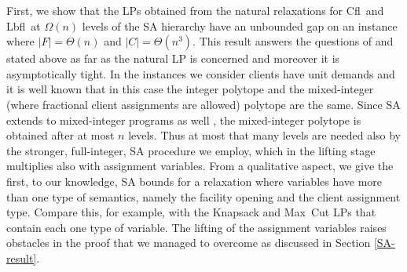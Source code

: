 \documentclass[11pt]{article}
\newcommand{\lbfl}{{\sc Lbfl}}
\newcommand{\cfl}{{\sc Cfl}}
\begin{document}
First, we show that the LPs  obtained from the
natural relaxations for  \cfl\ and \lbfl\ at $\Omega(n)$ levels of the 
SA hierarchy have an unbounded gap on an  instance
where 
 $|F|=\Theta(n)$ and $|C|= \Theta(n^3).$ 
This result answers the questions of \cite{LiS13} and
\cite{AnBS13} stated above as far as the natural LP is concerned 
and moreover it  is asymptotically tight.
In the  instances we consider clients  have unit demands and
it is well known that in this case the integer polytope and the 
mixed-integer (where fractional client assignments are allowed) 
polytope are the same.  Since SA extends to mixed-integer
programs  as well  \cite{Cornuejols08,BalasCC93},  the mixed-integer
polytope is obtained after at most  $n$ levels. Thus at most that many
levels are needed  also by the stronger, full-integer, SA procedure we employ,
which in the lifting stage multiplies 
also with assignment variables. 
From a qualitative aspect,   we  give  the first, to our knowledge, SA
bounds for a relaxation where variables have more than one type of
semantics, namely
the facility opening and the client assignment type. 
Compare this, for example, with the Knapsack and Max~Cut LPs that
contain each one type of variable. 
The lifting of the assignment variables 
raises obstacles in the proof that we managed to overcome as discussed
in Section \ref{SA-result}. 
\end{document}
